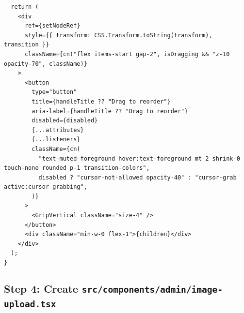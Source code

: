 \documentclass[11pt,a4paper]{article}
\begin{document}
\begin{lstlisting}
  return (
    <div
      ref={setNodeRef}
      style={{ transform: CSS.Transform.toString(transform), transition }}
      className={cn("flex items-start gap-2", isDragging && "z-10 opacity-70", className)}
    >
      <button
        type="button"
        title={handleTitle ?? "Drag to reorder"}
        aria-label={handleTitle ?? "Drag to reorder"}
        disabled={disabled}
        {...attributes}
        {...listeners}
        className={cn(
          "text-muted-foreground hover:text-foreground mt-2 shrink-0 touch-none rounded p-1 transition-colors",
          disabled ? "cursor-not-allowed opacity-40" : "cursor-grab active:cursor-grabbing",
        )}
      >
        <GripVertical className="size-4" />
      </button>
      <div className="min-w-0 flex-1">{children}</div>
    </div>
  );
}
\end{lstlisting}

\subsection*{Step 4: Create \texttt{src/components/admin/image-upload.tsx}}
\end{document}
